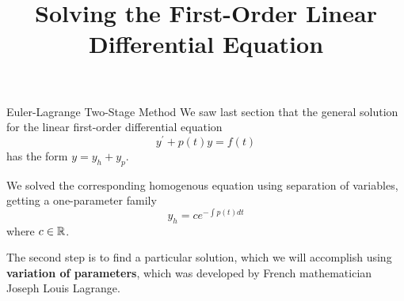 \documentclass{beamer}
\title[MA245 - Section 2.2]{Solving the First-Order Linear Differential Equation}
\begin{document}
\begin{frame}
\titlepage
\end{frame}

\begin{frame}
\begin{block}{Euler-Lagrange Two-Stage Method}
We saw last section that the general solution for the linear first-order differential equation
\begin{equation*}
y^\prime+p(t) y = f(t)
\end{equation*}
has the form $y=y_h+y_p$.\pause

\vspace{2mm}
We solved the corresponding homogenous equation using separation of variables, getting a one-parameter family
\begin{equation*}
y_h=c e^{-\int p(t) dt}
\end{equation*}
where $c\in\mathbb{R}$.\pause

\vspace{2mm}
The second step is to find a particular solution, which we will accomplish using \textbf{variation of parameters}, which was developed by French mathematician Joseph Louis Lagrange.
\end{block}
\end{frame}
\end{document}
